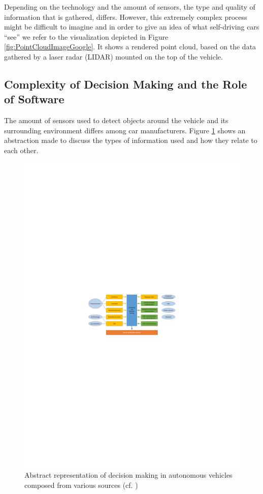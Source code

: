 Depending on the technology and the amount of sensors, the type and quality of information that is gathered, differs. However, this extremely complex process might be difficult to imagine and in order to give an idea of what self-driving cars \enquote{see} we refer to the visualization depicted in Figure \ref{fig:PointCloudImageGoogle}. It shows a rendered point cloud, based on the data gathered by a laser radar (LIDAR) mounted on the top of the vehicle. 


\subsection{Complexity of Decision Making and the Role of Software}
\label{sec:SelfDrivingCarsBasics:ComplexityOfDecisionMaking}

The amount of sensors used to detect objects around the vehicle and its surrounding environment differs among car manufacturers. Figure \ref{fig:DecisionMaking} shows an abstraction made to discuss the types of information used and how they relate to each other. 

\begin{figure}
\centering
\includegraphics[width=1\linewidth]{Figures/DecisonMaking.pdf}
\caption{Abstract representation of decision making in autonomous vehicles composed from various sources (cf.  \cite{EarthImagingJournalEIJ:RemoteSensingSatelliteImages2012,Waldrop2015,Waymo2017technology,Tesla2016_upgrade})}
\label{fig:DecisionMaking}
\end{figure}

